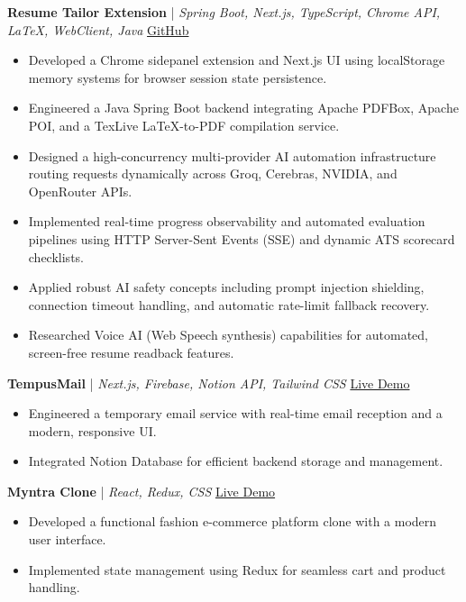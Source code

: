 \documentclass[a4paper,10pt]{article}
\begin{document}
\textbf{Resume Tailor Extension} | \textit{Spring Boot, Next.js, TypeScript, Chrome API, LaTeX, WebClient, Java} \hfill \href{https://github.com/Abhishek6827/Resume-Extension}{GitHub}
\begin{itemize}[leftmargin=0.15in, label={-}]
    \item Developed a Chrome sidepanel extension and Next.js UI using localStorage memory systems for browser session state persistence.
    \item Engineered a Java Spring Boot backend integrating Apache PDFBox, Apache POI, and a TexLive LaTeX-to-PDF compilation service.
    \item Designed a high-concurrency multi-provider AI automation infrastructure routing requests dynamically across Groq, Cerebras, NVIDIA, and OpenRouter APIs.
    \item Implemented real-time progress observability and automated evaluation pipelines using HTTP Server-Sent Events (SSE) and dynamic ATS scorecard checklists.
    \item Applied robust AI safety concepts including prompt injection shielding, connection timeout handling, and automatic rate-limit fallback recovery.
    \item Researched Voice AI (Web Speech synthesis) capabilities for automated, screen-free resume readback features.
\end{itemize}

\textbf{TempusMail} | \textit{Next.js, Firebase, Notion API, Tailwind CSS} \hfill \href{https://tempusmail-backend--tempusmail6827.us-central1.hosted.app/}{Live Demo}
\begin{itemize}[leftmargin=0.15in, label={-}]
    \item Engineered a temporary email service with real-time email reception and a modern, responsive UI.
    \item Integrated Notion Database for efficient backend storage and management.
\end{itemize}

\textbf{Myntra Clone} | \textit{React, Redux, CSS} \hfill \href{https://abhishek6827.github.io/Myntra/}{Live Demo}
\begin{itemize}[leftmargin=0.15in, label={-}]
    \item Developed a functional fashion e-commerce platform clone with a modern user interface.
    \item Implemented state management using Redux for seamless cart and product handling.
\end{itemize}
\end{document}
